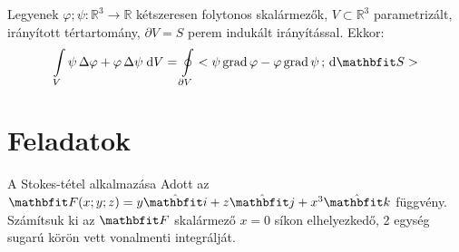 \documentclass[lang=magyar]{math-handout}
\begin{document}
\vfill

\begin{theorem}
  Legyenek $\varphi; \psi: \mathbb R^3 \rightarrow \mathbb R$ kétszeresen
  folytonos skalármezők, $V \subset \mathbb R^3$ parametrizált, irányított
  tértartomány, $\partial V = S$ perem indukált irányítással. Ekkor:
  \[
    \int \limits_V
    \psi \, \Delta \varphi + \varphi \, \Delta \psi
    \; \diff V
    =
    \oint \limits_{\partial V}
    \scalar{\psi \grad \varphi - \varphi \grad \psi}{\diff \rvec S}
  \]
\end{theorem}

\clearpage
\section{Feladatok}

\begin{exercise}{A Stokes-tétel alkalmazása}
  Adott az $\rvec F(x;y;z) = y \uvec i + z \uvec j + x^3 \uvec k$ függvény.
  Számítsuk ki az $\rvec F$ skalármező $x = 0$ síkon elhelyezkedő, 2 egység
  sugarú körön vett vonalmenti integrálját.

\end{exercise}
\end{document}
